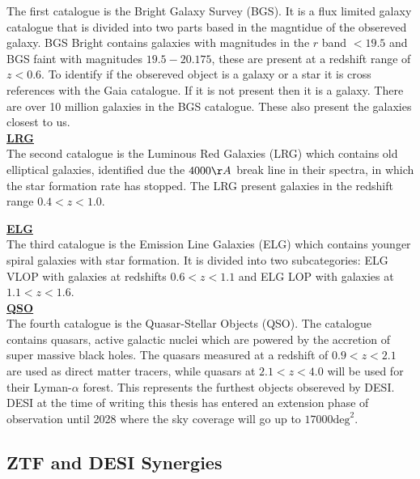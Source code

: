 The first catalogue is the Bright Galaxy Survey (BGS). It is a flux limited galaxy catalogue that is divided into two parts based in the magntidue of the obsereved galaxy. BGS 
Bright contains galaxies with magnitudes in the $r$ band $<19.5$ and BGS faint with magnitudes $19.5 - 20.175$, these are present at a redshift range of $z<0.6$. To identify if the obsereved object is a galaxy or a star it is 
cross references with the Gaia catalogue. If it is not present then it is a galaxy. There are over 10 million galaxies in the BGS catalogue. These also present the galaxies closest to us. \\

\noindent \textbf{\underline{LRG}} \\

The second catalogue is the Luminous Red Galaxies (LRG) which contains old elliptical galaxies, identified due the $4000\AA$ break line in their spectra, in which 
the star formation rate has stopped. The LRG present galaxies in the redshift range $0.4<z<1.0$.

\noindent \textbf{\underline{ELG}} \\

The third catalogue is the Emission Line Galaxies (ELG) which contains younger spiral galaxies with star formation. It is divided into two subcategories: ELG VLOP with galaxies 
at redshifts $0.6<z<1.1$ and ELG LOP with galaxies at $1.1<z<1.6$. \\ 

\noindent \textbf{\underline{QSO}} \\

The fourth catalogue is the Quasar-Stellar Objects (QSO). The catalogue contains quasars, active galactic nuclei which are powered by the accretion of super massive black holes. 
The quasars measured at a redshift of $0.9<z<2.1$ are used as direct matter tracers, while quasars at $2.1<z<4.0$ will be used for their Lyman-$\alpha$ forest. This 
represents the furthest objects obsereved by DESI. \\

DESI at the time of writing this thesis has entered an extension phase of observation until 2028 where the sky coverage will go up to $17000\text{deg}^2$. \\

\subsection{ZTF and DESI Synergies}

